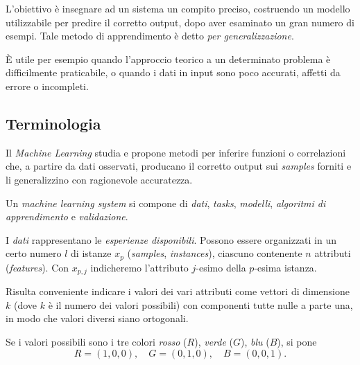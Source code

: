 
\makeatletter
\def\ml{Machine Learning}
\makeatother



L'obiettivo è insegnare ad un sistema un compito preciso, costruendo un modello utilizzabile per predire il corretto output, dopo aver esaminato un gran numero di esempi. Tale metodo di apprendimento è detto \emph{per generalizzazione}.

È utile per esempio quando l'approccio teorico a un determinato problema è difficilmente praticabile, o quando i dati in input sono poco accurati, affetti da errore o incompleti.

\subsection{Terminologia}

\begin{definition}
Il \emph{\ml} studia e propone metodi per inferire funzioni o correlazioni che, a partire da dati osservati, producano il corretto output sui \emph{samples} forniti e li generalizzino con ragionevole accuratezza.
\end{definition}

Un \emph{machine learning system} si compone di \emph{dati}, \emph{tasks}, \emph{modelli}, \emph{algoritmi di apprendimento} e \emph{validazione}.

\begin{definition}[Dati]
I \emph{dati} rappresentano le \emph{esperienze disponibili}. Possono essere organizzati in un certo numero $l$ di istanze $x_p$ (\emph{samples}, \emph{instances}), ciascuno contenente $n$ attributi (\emph{features}). Con $x_{p,j}$ indicheremo l'attributo $j$-esimo della $p$-esima istanza. 
\end{definition}

Risulta conveniente indicare i valori dei vari attributi come vettori di dimensione $k$ (dove $k$ è il numero dei valori possibili) con componenti tutte nulle a parte una, in modo che valori diversi siano ortogonali.
\begin{example}
Se i valori possibili sono i tre colori \emph{rosso} ($R$), \emph{verde} ($G$), \emph{blu} ($B$), si pone
\begin{equation}
R=(1,0,0),\quad G=(0,1,0),\quad B=(0,0,1).
\end{equation}
\end{example}


